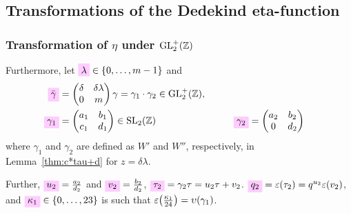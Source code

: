 \documentclass{article}
\begin{document}
\begin{Hemmecke}

\subsection{Transformations of the Dedekind eta-function}

\subsubsection{Transformation of $\eta$ under $\mathrm{GL}_2^+(\mathbb{Z})$}
\label{sec:eta-transformation}


Furthermore, let
$\defineNotation[lambda]{\lambda}\in\Set{0,\ldots,m-1}$ and
\begin{alignat}{2}
  \defineNotation[gammabar]{\bar{\gamma}}
  &=
    \begin{pmatrix}\delta& \delta \lambda\\0&m\end{pmatrix}
    \gamma
    =
    \gamma_1 \cdot \gamma_2
    \in \mathrm{GL}_2^+(\setZ),
    \label{eq:gammabar}
  \\
  \defineNotation[gamma1]{\gamma_1}
  &=
    \begin{pmatrix}a_1& b_1\\c_1&d_1\end{pmatrix} \in \SL2Z
  &\qquad
  \defineNotation[gamma2]{\gamma_2}
  &=
    \begin{pmatrix}a_2& b_2\\0  &d_2\end{pmatrix}
    \label{eq:gamma1}
\end{alignat}
where $\gamma_1$ and $\gamma_2$ are defined as $W'$ and $W''$,
respectively, in Lemma~\ref{thm:c*tau+d} for $z = \delta\lambda$.

Further, $\defineNotation[u2]{u_2} = \frac{a_2}{d_2}$ and
$\defineNotation[v2]{v_2} = \frac{b_2}{d_2}$,
$\defineNotation[tau2]{\tau_2} = \gamma_2\tau = u_2\tau + v_2$.
$\defineNotation[q2]{q_2} = \unityPower{\tau_2} =
q^{u_2}\unityPower{v_2}$, and
$\defineNotation[kappa1]{\kappa_1} \in \Set{0,\ldots,23}$ is such that
$\varepsilon\!\left(\frac{\kappa_1}{24}\right) = \upsilon(\gamma_1)$.













\end{Hemmecke}
\end{document}
